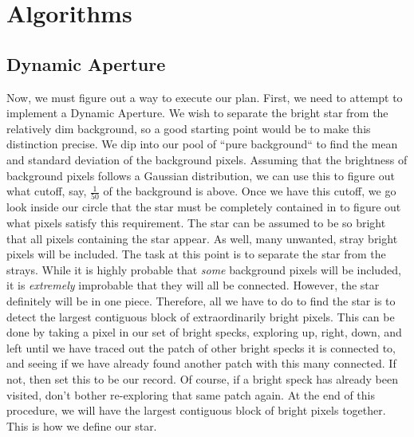 \documentclass[12pt]{article}
\begin{document}
\section{Algorithms}
\subsection{Dynamic Aperture}
\indent \indent Now, we must figure out a way to execute our plan. First, we need to attempt to implement a Dynamic Aperture. We wish to separate the bright star from the relatively dim background, so a good starting point would be to make this distinction precise. We dip into our pool of ``pure background`` to find the mean and standard deviation of the background pixels. Assuming that the brightness of background pixels follows a Gaussian distribution, we can use this to figure out what cutoff, say, $ \frac{1}{50} $ of the background is above. Once we have this cutoff, we go look inside our circle that the star must be completely contained in to figure out what pixels satisfy this requirement. The star can be assumed to be so bright that all pixels containing the star appear. As well, many unwanted, stray bright pixels will be included. The task at this point is to separate the star from the strays. While it is highly probable that \textit{some} background pixels will be included, it is \textit{extremely} improbable that they will all be connected. However, the star definitely will be in one piece. Therefore, all we have to do to find the star is to detect the largest contiguous block of extraordinarily bright pixels. This can be done by taking a pixel in our set of bright specks, exploring up, right, down, and left until we have traced out the patch of other bright specks it is connected to, and seeing if we have already found another patch with this many connected. If not, then set this to be our record. Of course, if a bright speck has already been visited, don't bother re-exploring that same patch again. At the end of this procedure, we will have the largest contiguous block of bright pixels together. This is how we define our star.
\end{document}
